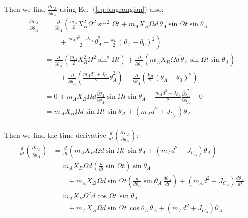 \documentclass[titlepage]{article}
\begin{document}
Then we find $\frac{\partial L_A}{\partial\dot{\theta}_A}$ using Eq.~(\ref{eq:blagrangian}) also:
\begin{equation}
	\begin{split}
		\frac{\partial L_A}{\partial\dot{\theta}_A}&=\frac{\partial}{\partial\dot{\theta}_A}\left(\frac{m_A}{2}X_B^2\Omega^2\sin^2\Omega t+m_AX_B\Omega d\,\dot{\theta}_A\sin\Omega t\sin\theta_A\right. \\
		&\left.\qquad+\frac{m_Ad^2+J_{C_A}}{2}\dot{\theta}_A^2-\frac{k_H}{2}\left(\theta_A-\theta_0\right)^2\right) \\
		&=\frac{\partial}{\partial\dot{\theta}_A}\left(\frac{m_A}{2}X_B^2\Omega^2\sin^2\Omega t\right)+\frac{\partial}{\partial\dot{\theta}_A}\left(m_AX_B\Omega d\,\dot{\theta}_A\sin\Omega t\sin\theta_A\right) \\
		&\qquad+\frac{\partial}{\partial\dot{\theta}_A}\left(\frac{m_Ad^2+J_{C_A}}{2}\dot{\theta}_A^2\right)-\frac{\partial}{\partial\dot{\theta}_A}\left(\frac{k_H}{2}\left(\theta_A-\theta_0\right)^2\right) \\
		&=0+m_AX_B\Omega d\frac{\partial\dot{\theta}_A}{\partial\dot{\theta}_A}\sin\Omega t\sin\theta_A+\frac{m_Ad^2+J_{C_A}}{2}\frac{\partial\dot{\theta}_A^2}{\partial\dot{\theta}_A}-0 \\
		&=m_AX_B\Omega d\sin\Omega t\,\sin\theta_A+\left(m_Ad^2+J_{C_A}\right)\dot{\theta}_A \\
	\end{split}
\end{equation}

Then we find the time derivative $\frac{d}{dt}\left(\frac{\partial L_A}{\partial\dot{\theta}_A}\right)$:
\begin{equation}
	\begin{split}
		\frac{d}{dt}\left(\frac{\partial L_A}{\partial\dot{\theta}_A}\right)&=\frac{d}{dt}\left(m_AX_B\Omega d\sin\Omega t\,\sin\theta_A+\left(m_Ad^2+J_{C_A}\right)\dot{\theta}_A\right) \\
		&=m_AX_B\Omega d\left(\frac{d}{dt}\sin\Omega t\right)\sin\theta_A \\
		&\qquad+m_AX_B\Omega d\sin\Omega t\left(\frac{d}{d\theta_A}\sin\theta_A\,\frac{d\theta_A}{dt}\right)+\left(m_Ad^2+J_{C_A}\right)\frac{d\dot{\theta}_A}{dt} \\
		&=m_AX_B\Omega^2d\cos\Omega t\,\sin\theta_A \\
		&\qquad+m_AX_B\Omega d\sin\Omega t\,\cos\theta_A\,\dot{\theta}_A+\left(m_Ad^2+J_{C_A}\right)\ddot{\theta}_A \\
	\end{split}
\end{equation}
\end{document}
